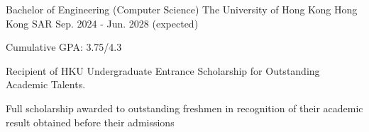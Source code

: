 

\begin{cventries}

  \cventry
    {Bachelor of Engineering (Computer Science)} %
    {The University of Hong Kong} %
    {Hong Kong SAR} %
    {Sep. 2024 - Jun. 2028 (expected)} %
    {
      \begin{cvitems} %
        \item {Cumulative GPA: 3.75/4.3}
        \item {Recipient of HKU Undergraduate Entrance Scholarship for Outstanding Academic Talents.}
        \item {Full scholarship awarded to outstanding freshmen in recognition of their academic result obtained before their
admissions}
      \end{cvitems}
    }

\end{cventries}
